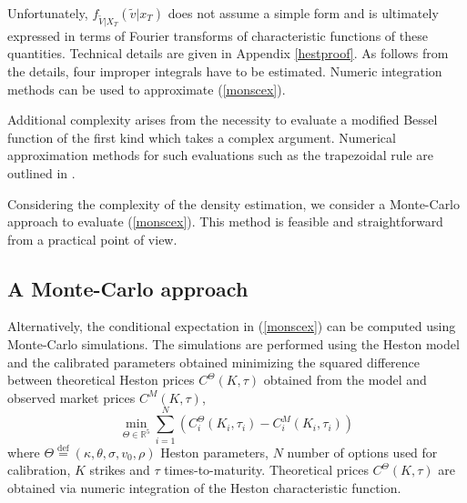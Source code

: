 \documentclass{rQUF2e}
\theoremstyle{plain}
\theoremstyle{definition}
\begin{document}
	Unfortunately, $f_{\widetilde{V}|X_T}(\widetilde{v}|x_T)$ does not assume a simple form and is ultimately expressed in terms of Fourier transforms of characteristic functions of these quantities. Technical details are given in Appendix \ref{hestproof}. As follows from the details, four improper integrals have to be estimated. Numeric integration methods can be used to approximate (\ref{monscex}).
	
	Additional complexity arises from the necessity to evaluate a modified Bessel function of the first kind which takes a complex argument. Numerical approximation methods for such evaluations such as the trapezoidal rule are outlined in \citet{broadie_kaya}.

	Considering the complexity of the density estimation, we consider a Monte-Carlo approach to evaluate (\ref{monscex}). This method is feasible and straightforward from a practical point of view.
	
	\subsection{A Monte-Carlo approach}
	Alternatively, the conditional expectation in (\ref{monscex}) can be computed using Monte-Carlo simulations. The simulations are performed using the Heston model and the calibrated parameters obtained minimizing the squared difference between theoretical Heston prices $C^{\Theta}(K,\tau)$ obtained from the model and observed market prices $C^{M}(K,\tau)$, 
	\begin{equation}
	\underset{\Theta \in \mathbb{R}^5}{\operatorname{min}} \sum_{i=1}^N \left(  C_i^{\Theta}(K_i,\tau_i) - C_i^{M}(K_i,\tau_i) \right) 
	\end{equation}
	where $\Theta \stackrel{\operatorname{def}}{=} (\kappa, \theta, \sigma, v_0, \rho)$ Heston parameters, $N$ number of options used for calibration, $K$ strikes and $\tau$ times-to-maturity. Theoretical prices $C^{\Theta}(K,\tau)$ are obtained via numeric integration of the Heston characteristic function.
	
\end{document}
